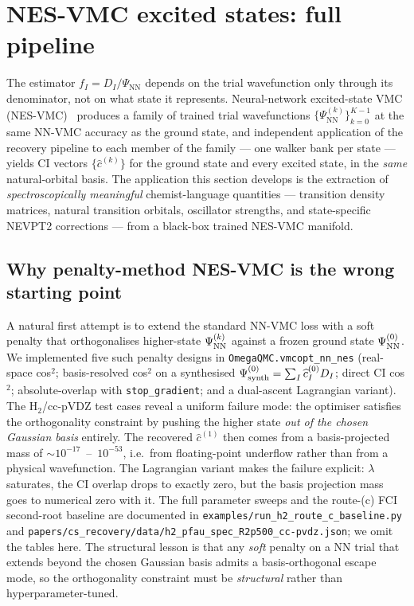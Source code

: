 \documentclass[journal=jctcce,manuscript=suppinfo,layout=traditional]{achemso}
\begin{document}
\section{NES-VMC excited states: full pipeline}
\label{sec:supp_excited}
\label{sec:excited_states_apps}

The estimator $f_I = D_I / \Psi_{\mathrm{NN}}$ depends on the trial
wavefunction only through its denominator, not on what state it
represents. Neural-network excited-state VMC
(NES-VMC)~\cite{Pfau2024ExcitedStates} produces a family of trained
trial wavefunctions $\{\Psi_{\mathrm{NN}}^{(k)}\}_{k=0}^{K-1}$ at the
same NN-VMC accuracy as the ground state, and independent application
of the recovery pipeline to each member of the family --- one walker
bank per state --- yields CI vectors $\{\widehat{c}^{(k)}\}$ for the
ground state and every excited state, in the \emph{same}
natural-orbital basis. The application this section develops is the
extraction of \emph{spectroscopically meaningful} chemist-language
quantities --- transition density matrices, natural transition
orbitals, oscillator strengths, and state-specific NEVPT2 corrections
--- from a black-box trained NES-VMC manifold.

\subsection{Why penalty-method NES-VMC is the wrong starting point}

A natural first attempt is to extend the standard NN-VMC loss with a
soft penalty that orthogonalises higher-state $\Psi_{\rm NN}^{(k)}$
against a frozen ground state $\Psi_{\rm NN}^{(0)}$. We implemented
five such penalty designs in \texttt{OmegaQMC.vmcopt\_nn\_nes} (real-
space cos$^2$; basis-resolved cos$^2$ on a synthesised
$\Psi_{\rm synth}^{(0)} = \sum_I \widehat{c}^{(0)}_I D_I$; direct CI
cos$^2$; absolute-overlap with \texttt{stop\_gradient}; and a
dual-ascent Lagrangian variant). The H$_2$/cc-pVDZ test cases reveal a
uniform failure mode: the optimiser satisfies the orthogonality
constraint by pushing the higher state \emph{out of the chosen
Gaussian basis} entirely. The recovered $\widehat{c}^{(1)}$ then comes
from a basis-projected mass of $\sim 10^{-17}$~--~$10^{-53}$,
i.e.\ from floating-point underflow rather than from a physical
wavefunction. The Lagrangian variant makes the failure explicit:
$\lambda$ saturates, the CI overlap drops to exactly zero, but the
basis projection mass goes to numerical zero with it. The full
parameter sweeps and the route-(c) FCI second-root baseline are
documented in \texttt{examples/run\_h2\_route\_c\_baseline.py} and
\texttt{papers/cs\_recovery/data/h2\_pfau\_spec\_R2p500\_cc-pvdz.json};
we omit the tables here. The structural lesson is that any
\emph{soft} penalty on a NN trial that extends beyond the chosen
Gaussian basis admits a basis-orthogonal escape mode, so the
orthogonality constraint must be \emph{structural} rather than
hyperparameter-tuned.
\end{document}
